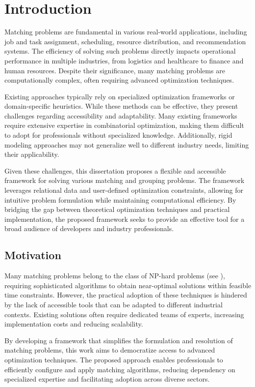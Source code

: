 \chapter{Introduction} \label{chap:introduction}

Matching problems are fundamental in various real-world applications, including job and task assignment, scheduling, resource distribution, and recommendation systems. The efficiency of solving such problems directly impacts operational performance in multiple industries, from logistics and healthcare to finance and human resources. Despite their significance, many matching problems are computationally complex, often requiring advanced optimization techniques.

Existing approaches typically rely on specialized optimization frameworks or domain-specific heuristics\cite{ieee_survey}. While these methods can be effective, they present challenges regarding accessibility and adaptability. Many existing frameworks require extensive expertise in combinatorial optimization, making them difficult to adopt for professionals without specialized knowledge. Additionally, rigid modeling approaches may not generalize well to different industry needs, limiting their applicability.

Given these challenges, this dissertation proposes a flexible and accessible framework for solving various matching and grouping problems. The framework leverages relational data and user-defined optimization constraints, allowing for intuitive problem formulation while maintaining computational efficiency. By bridging the gap between theoretical optimization techniques and practical implementation, the proposed framework seeks to provide an effective tool for a broad audience of developers and industry professionals.

\section{Motivation}
Many matching problems belong to the class of NP-hard problems (see \cite{karp1972reducibility}), requiring sophisticated algorithms to obtain near-optimal solutions within feasible time constraints. However, the practical adoption of these techniques is hindered by the lack of accessible tools that can be adapted to different industrial contexts. Existing solutions often require dedicated teams of experts, increasing implementation costs and reducing scalability.

By developing a framework that simplifies the formulation and resolution of matching problems, this work aims to democratize access to advanced optimization techniques. The proposed approach enables professionals to efficiently configure and apply matching algorithms, reducing dependency on specialized expertise and facilitating adoption across diverse sectors.

